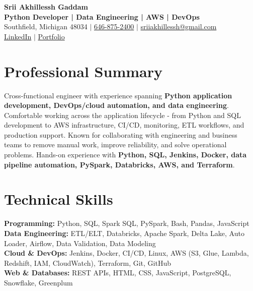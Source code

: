 \documentclass[letterpaper,10pt]{article}
\begin{document}
\fontsize{9.35pt}{10.45pt}\selectfont

\begin{center}
    {\LARGE \textbf{Srii Akhillessh Gaddam}} \\[-1pt]
    \textbf{Python Developer | Data Engineering | AWS | DevOps} \\[2pt]
    Southfield, Michigan 48034 $|$
    \href{tel:6468752400}{646-875-2400} $|$
    \href{mailto:sriiakhillessh@gmail.com}{sriiakhillessh@gmail.com} \\[1pt]
    \href{https://www.linkedin.com/in/srii-akhiilessh-gaddam-b48668191/}{LinkedIn} $|$
    \href{https://sriiakhillesshg.github.io/portfolio/}{Portfolio}
\end{center}
\vspace{-8pt}

\section{Professional Summary}
\small{Cross-functional engineer with experience spanning \textbf{Python application development, DevOps/cloud automation, and data engineering}. Comfortable working across the application lifecycle - from Python and SQL development to AWS infrastructure, CI/CD, monitoring, ETL workflows, and production support. Known for collaborating with engineering and business teams to remove manual work, improve reliability, and solve operational problems. Hands-on experience with \textbf{Python, SQL, Jenkins, Docker, data pipeline automation, PySpark, Databricks, AWS, and Terraform}.}

\section{Technical Skills}
\small{
\textbf{Programming:} Python, SQL, Spark SQL, PySpark, Bash, Pandas, JavaScript \\
\textbf{Data Engineering:} ETL/ELT, Databricks, Apache Spark, Delta Lake, Auto Loader, Airflow, Data Validation, Data Modeling \\
\textbf{Cloud \& DevOps:} Jenkins, Docker, CI/CD, Linux, AWS (S3, Glue, Lambda, Redshift, IAM, CloudWatch), Terraform, Git, GitHub \\
\textbf{Web \& Databases:} REST APIs, HTML, CSS, JavaScript, PostgreSQL, Snowflake, Greenplum
}
\end{document}
